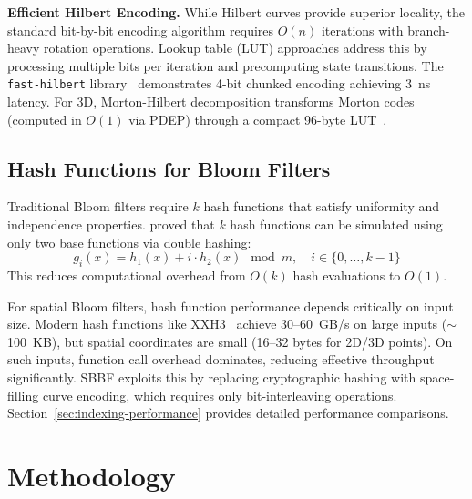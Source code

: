 \documentclass[conference,a4paper]{IEEEtran}
\begin{document}
\textbf{Efficient Hilbert Encoding.} While Hilbert curves provide superior locality, the standard bit-by-bit encoding algorithm requires $O(n)$ iterations with branch-heavy rotation operations. Lookup table (LUT) approaches address this by processing multiple bits per iteration and precomputing state transitions. The \texttt{fast-hilbert} library~\citep{FastHilbert} demonstrates 4-bit chunked encoding achieving 3~ns latency. For 3D, Morton-Hilbert decomposition transforms Morton codes (computed in $O(1)$ via PDEP) through a compact 96-byte LUT~\citep{ThreadLocalMutex3D}.

\subsection{Hash Functions for Bloom Filters}
Traditional Bloom filters require $k$ hash functions that satisfy uniformity and independence properties. \citet{Kirsch2008} proved that $k$ hash functions can be simulated using only two base functions via double hashing:
\begin{equation}
    g_i(x) = h_1(x) + i \cdot h_2(x) \mod m, \quad i \in \{0, \ldots, k-1\}
\end{equation}
This reduces computational overhead from $O(k)$ hash evaluations to $O(1)$.

For spatial Bloom filters, hash function performance depends critically on input size. Modern hash functions like XXH3~\citep{Collet2016xxHash} achieve 30--60~GB/s on large inputs ($\sim$100~KB), but spatial coordinates are small (16--32 bytes for 2D/3D points). On such inputs, function call overhead dominates, reducing effective throughput significantly. SBBF exploits this by replacing cryptographic hashing with space-filling curve encoding, which requires only bit-interleaving operations. Section~\ref{sec:indexing-performance} provides detailed performance comparisons.

\section{Methodology}
\end{document}
